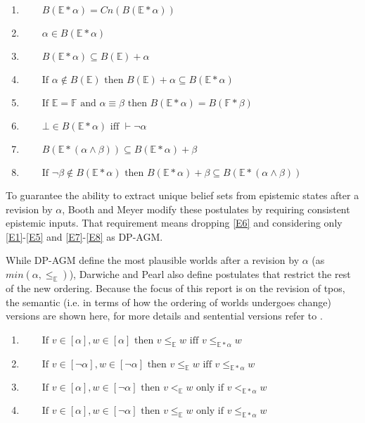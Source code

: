 \documentclass[english, 12pt]{scrartcl}
\theoremstyle{definition}
\theoremstyle{definition}
\theoremstyle{definition}
\begin{document}
\begin{enumerate}[wide=0pt, widest=99,leftmargin=\parindent,label = ($\mathbb{E}\!*\!\arabic*$)]
    \item\label{E1} $\qquad B(\mathbb{E}\ast\alpha) = Cn(B(\mathbb{E}\ast\alpha))$
    \item\label{E2} $\qquad \alpha \in B(\mathbb{E}\ast\alpha)$
    \item\label{E3} $\qquad B(\mathbb{E}\ast\alpha)  \subseteq B(\mathbb{E})+\alpha$
    \item\label{E4} $\qquad \textrm{If } \alpha \notin B(\mathbb{E}) \textrm{ then } B(\mathbb{E}) + \alpha \subseteq B(\mathbb{E} \ast \alpha)$
    \item\label{E5} $\qquad \textrm{If } \mathbb{E} = \mathbb{F} \textrm{ and } \alpha \equiv \beta \textrm{ then } B(\mathbb{E} \ast \alpha) = B(\mathbb{F} \ast \beta)$
    \item\label{E6} $\qquad \bot \in B(\mathbb{E} \ast \alpha) \textrm{ iff } \vdash \neg \alpha$
    \item\label{E7} $\qquad B(\mathbb{E} \ast (\alpha \wedge \beta)) \subseteq B(\mathbb{E} \ast \alpha) + \beta$
    \item\label{E8} $\qquad \textrm{If } \neg \beta \notin B(\mathbb{E} \ast \alpha) \textrm{ then } B(\mathbb{E} \ast \alpha) + \beta \subseteq B(\mathbb{E} \ast (\alpha \wedge \beta))$
\end{enumerate}

To guarantee the ability to extract unique belief sets from epistemic states after a revision by $\alpha$, Booth and Meyer \cite{Booth2011} modify these postulates by requiring consistent epistemic inputs. That requirement means dropping \ref{E6} and considering only \ref{E1}-\ref{E5} and \ref{E7}-\ref{E8} as DP-AGM.

While DP-AGM define the most plausible worlds after a revision by $\alpha$ (as $min(\alpha, \leq_{\mathbb{E}})$), Darwiche and Pearl also define postulates that restrict the rest of the new ordering. Because the focus of this report is on the revision of tpos, the semantic (i.e. in terms of how the ordering of worlds undergoes change) versions are shown here, for more details and sentential versions refer to \cite{Darwiche1997}.

\begin{enumerate}[wide=0pt, widest=99,leftmargin=\parindent,label = (CR$\arabic*$)]
    \item\label{CR1} $\qquad \textrm{If } v\in [\alpha], w \in [\alpha] \textrm{ then } v \leq_{\mathbb{E}} w \textrm{ iff } v \leq_{\mathbb{E\ast\alpha}} w$
    \item\label{CR2} $\qquad \textrm{If } v\in [\neg \alpha], w \in [\neg \alpha] \textrm{ then } v \leq_{\mathbb{E}} w \textrm{ iff } v \leq_{\mathbb{E\ast\alpha}} w$
    \item\label{CR3} $\qquad \textrm{If } v\in [ \alpha], w \in [\neg \alpha] \textrm{ then } v <_{\mathbb{E}} w \textrm{ only if } v <_{\mathbb{E\ast\alpha}} w$
    \item\label{CR4} $\qquad \textrm{If } v\in [ \alpha], w \in [\neg \alpha] \textrm{ then } v \leq_{\mathbb{E}} w \textrm{ only if } v \leq_{\mathbb{E\ast\alpha}} w$
\end{enumerate}
\end{document}
